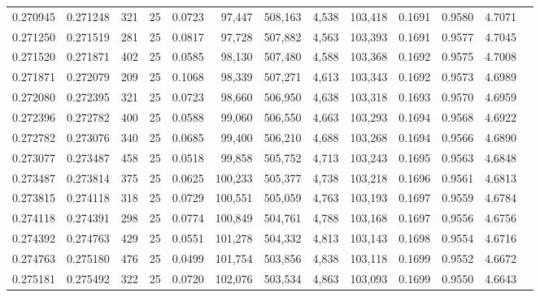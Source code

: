 \begin{tabular}{rrrrrrrrrrrrr}
0.270945 & 0.271248 &   321 &  25 &                                     0.0723 &  97,447 & 508,163 &   4,538 & 103,418 & 0.1691 & 0.9580 & 4.7071 \\
0.271250 & 0.271519 &   281 &  25 &                                     0.0817 &  97,728 & 507,882 &   4,563 & 103,393 & 0.1691 & 0.9577 & 4.7045 \\
0.271520 & 0.271871 &   402 &  25 &                                     0.0585 &  98,130 & 507,480 &   4,588 & 103,368 & 0.1692 & 0.9575 & 4.7008 \\
0.271871 & 0.272079 &   209 &  25 &                                     0.1068 &  98,339 & 507,271 &   4,613 & 103,343 & 0.1692 & 0.9573 & 4.6989 \\
0.272080 & 0.272395 &   321 &  25 &                                     0.0723 &  98,660 & 506,950 &   4,638 & 103,318 & 0.1693 & 0.9570 & 4.6959 \\
0.272396 & 0.272782 &   400 &  25 &                                     0.0588 &  99,060 & 506,550 &   4,663 & 103,293 & 0.1694 & 0.9568 & 4.6922 \\
0.272782 & 0.273076 &   340 &  25 &                                     0.0685 &  99,400 & 506,210 &   4,688 & 103,268 & 0.1694 & 0.9566 & 4.6890 \\
0.273077 & 0.273487 &   458 &  25 &                                     0.0518 &  99,858 & 505,752 &   4,713 & 103,243 & 0.1695 & 0.9563 & 4.6848 \\
0.273487 & 0.273814 &   375 &  25 &                                     0.0625 & 100,233 & 505,377 &   4,738 & 103,218 & 0.1696 & 0.9561 & 4.6813 \\
0.273815 & 0.274118 &   318 &  25 &                                     0.0729 & 100,551 & 505,059 &   4,763 & 103,193 & 0.1697 & 0.9559 & 4.6784 \\
0.274118 & 0.274391 &   298 &  25 &                                     0.0774 & 100,849 & 504,761 &   4,788 & 103,168 & 0.1697 & 0.9556 & 4.6756 \\
0.274392 & 0.274763 &   429 &  25 &                                     0.0551 & 101,278 & 504,332 &   4,813 & 103,143 & 0.1698 & 0.9554 & 4.6716 \\
0.274763 & 0.275180 &   476 &  25 &                                     0.0499 & 101,754 & 503,856 &   4,838 & 103,118 & 0.1699 & 0.9552 & 4.6672 \\
0.275181 & 0.275492 &   322 &  25 &                                     0.0720 & 102,076 & 503,534 &   4,863 & 103,093 & 0.1699 & 0.9550 & 4.6643 \\

\end{tabular}
